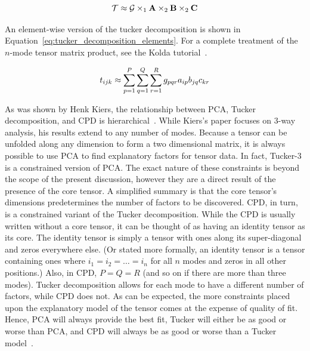 \documentclass[../ut-dissertation.tex]{subfiles}
\begin{document}
\begin{equation}\label{eq:tucker_decomposition}
  \mathcal{T} \approx \mathcal{G} \times_1 \mathrm{\bf A} \times_2 \mathrm{\bf B} \times_2
  \mathrm{\bf C}
\end{equation}

An element-wise version of the tucker decomposition is shown in
Equation~\ref{eq:tucker_decomposition_elements}.  For a complete
treatment of the $n$-mode tensor matrix product, see the Kolda
tutorial~\cite{kolda2009}.

\begin{equation}\label{eq:tucker_decomposition_elements}
  t_{ijk} \approx \displaystyle\sum_{p=1}^P \displaystyle\sum_{q=1}^Q \displaystyle\sum_{r=1}^R
  g_{pqr}a_{ip}b_{jq}c_{kr}
\end{equation}

As was shown by Henk Kiers, the relationship between PCA, Tucker
decomposition, and CPD is hierarchical~\cite{kiers1991}.  While
Kiers's paper focuses on 3-way analysis, his results extend to any
number of modes.  Because a tensor can be unfolded along any dimension
to form a two dimensional matrix, it is always possible to use PCA to
find explanatory factors for tensor data.  In fact, Tucker-3 is a
constrained version of PCA.  The exact nature of these constraints is
beyond the scope of the present discussion, however they are a direct
result of the presence of the core tensor.  A simplified summary is
that the core tensor's dimensions predetermines the number of
factors to be discovered.  CPD, in turn, is a constrained variant of
the Tucker decomposition.  While the CPD is usually written without a
core tensor, it can be thought of as having an identity tensor as its
core.  The identity tensor is simply a tensor with ones along its
super-diagonal and zeros everywhere else.  (Or stated more formally,
an identity tensor is a tensor containing ones where $i_1 = i_2 =
\ldots =i_n$ for all $n$ modes and zeros in all other positions.)
Also, in CPD, $P=Q=R$ (and so on if there are more than three modes).
Tucker decomposition allows for each mode to have a different number
of factors, while CPD does not.  As can be expected, the more
constraints placed upon the explanatory model of the tensor comes at
the expense of quality of fit.  Hence, PCA will always provide the
best fit, Tucker will either be as good or worse than PCA, and CPD
will always be as good or worse than a Tucker model~\cite{kiers1991,
  bro1997}.
\end{document}
